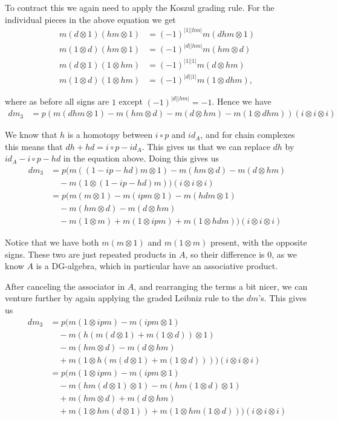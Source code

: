 To contract this we again need to apply the Koszul grading rule. For the individual pieces in the above equation we get
\begin{align*}
    m(d\otimes 1)(hm\otimes 1) &= (-1)^{|1||hm|}m(dhm\otimes 1) \\
    m(1\otimes d)(hm\otimes 1) &= (-1)^{|d||hm|}m(hm\otimes d) \\
    m(d\otimes 1)(1\otimes hm) &= (-1)^{|1||1|}m(d\otimes hm) \\
    m(1\otimes d)(1\otimes hm) &= (-1)^{|d||1|}m(1\otimes dhm),
\end{align*}

where as before all signs are $1$ except $(-1)^{|d||hm|}=-1$. Hence we have 
\begin{align*}
    dm_3 
    &= 
    p(m(dhm\otimes 1)-m(hm\otimes d)-m(d\otimes hm)-m(1\otimes dhm))(i\otimes i\otimes i)
\end{align*}

We know that $h$ is a homotopy between $i\circ p$ and $id_A$, and for chain complexes this means that $dh+hd=i\circ p - id_A$. This gives us that we can replace $dh$ by $id_A-i\circ p-hd$ in the equation above. Doing this gives us 
\begin{align*}
    dm_3 
    &= 
    p(m((1-ip-hd)m\otimes 1)-m(hm\otimes d)-m(d\otimes hm) \\
    &\quad -m(1\otimes (1-ip-hd)m))(i\otimes i\otimes i) \\
    &= 
    p(m(m\otimes 1)-m(ipm\otimes 1)-m(hdm\otimes 1) \\
    &\quad -m(hm\otimes d)-m(d\otimes hm) \\
    &\quad -m(1\otimes m)+m(1\otimes ipm)+m(1\otimes hdm))(i\otimes i\otimes i)
\end{align*}

Notice that we have both $m(m\otimes 1)$ and $m(1\otimes m)$ present, with the opposite signs. These two are just repeated products in $A$, so their difference is $0$, as we know $A$ is a DG-algebra, which in particular have an associative product.

After canceling the associator in $A$, and rearranging the terms a bit nicer, we can venture further by again applying the graded Leibniz rule to the $dm$'s. This gives us
\begin{align*}
    dm_3 
    &=
    p(m(1\otimes ipm)-m(ipm\otimes 1) \\
    &\quad -m(h(m(d\otimes 1)+m(1\otimes d))\otimes 1) \\
    &\quad -m(hm\otimes d)-m(d\otimes hm) \\
    &\quad +m(1\otimes h(m(d\otimes 1)+m(1\otimes d))))(i\otimes i\otimes i) \\
    &=
    p(m(1\otimes ipm)-m(ipm\otimes 1) \\
    &\quad - m(hm(d\otimes 1)\otimes 1) - m(hm(1\otimes d)\otimes 1) \\
    &\quad +m(hm\otimes d)+m(d\otimes hm) \\
    &\quad +m(1\otimes hm(d\otimes 1))+m(1\otimes hm(1\otimes d)))(i\otimes i\otimes i)
\end{align*}

